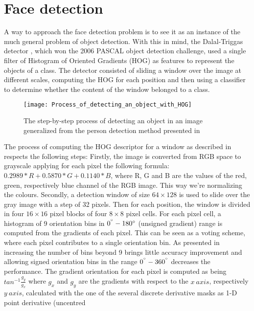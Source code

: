 \section{Face detection}
A way to approach the face detection problem is to see it as an instance of the much general problem of object detection. With this in mind, the Dalal-Triggas detector \cite{DalalTriggs05}, which won the 2006 PASCAL object detection challenge, used a single filter of Histogram of Oriented Gradients (HOG) as features to represent the objects of a class. The detector consisted of sliding a window over the image at different scales, computing the HOG for each position and then using a classifier to determine whether the content of the window belonged to a class.
\begin{figure}[h]
	\begin{center}
		\texttt{[image: Process\_of\_detecting\_an\_object\_with\_HOG]}
	\end{center}
	\caption[Process flow of detecting an object in an image]{The step-by-step process of detecting an object in an image generalized from the person detection method presented in \cite{DalalTriggs05}}
\end{figure}
The process of computing the HOG descriptor for a window as described in \cite{DalalTriggs05} respects the following steps: 
Firstly, the image is converted from RGB space to grayscale applying for each pixel the following formula: $0.2989 * R + 0.5870 * G + 0.1140 * B$, where R, G and B are the values of the red, green, respectively blue channel of the RGB image.	This way we're normalizing the colours. 
Secondly, a detection window of size $64\times128$ is used to slide over the gray image with a step of 32 pixels.
Then for each position, the window is divided in four $16\times16$ pixel blocks of four $8\times8$ pixel cells.
For each pixel cell, a histogram of 9 orientation bins in $0^{\degree}-180{\degree}$ (unsigned gradient) range is computed from the gradients of each pixel. This can be seen as a voting scheme, where each pixel contributes to a single orientation bin. As presented in \cite{DalalTriggs05} increasing the number of bins beyond 9 brings little accuracy improvement and allowing signed orientation bins in the range $0^{\degree}-360^{\degree}$ decreases the performance.
The gradient orientation for each pixel is computed as being $tan^{-1}\frac{g_{y}}{g_{x}}$ where $g_{x}$ and $g_{y}$ are the gradients with respect to the $x\ axis$, respectively $y\ axis$, calculated with the one of the several discrete derivative masks as 1-D point derivative (uncentred 
